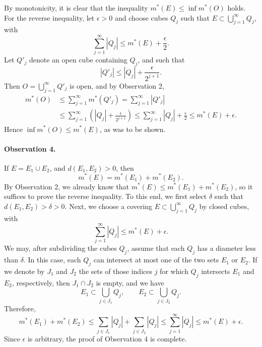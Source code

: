 \documentclass[11pt,openany]{book}
\begin{document}
By monotonicity, it is clear that the inequality $m^*(E)\le\inf m^*(O)$ holds. For the reverse inequality, let $\epsilon>0$ and choose cubes $Q_j$ such that $E\subset\bigcup_{j=1}^{\infty}Q_j$, with
\[
 \sum_{j=1}^{\infty}|Q_j|\le m^*(E)+\frac{\epsilon}{2}.
\]
Let $Q'_j$ denote an open cube containing $Q_j$, and such that
\[
 |Q'_j|\le |Q_j|+\frac{\epsilon}{2^{j+1}}.
\]
Then $O=\bigcup_{j=1}^{\infty}Q'_j$ is open, and by Observation 2,
\[
\begin{aligned}
 m^*(O)
 &\le\sum_{j=1}^{\infty}m^*(Q'_j)
 =\sum_{j=1}^{\infty}|Q'_j|\\
 &\le\sum_{j=1}^{\infty}\left(|Q_j|+\frac{\epsilon}{2^{j+1}}\right)
 \le\sum_{j=1}^{\infty}|Q_j|+\frac{\epsilon}{2}
 \le m^*(E)+\epsilon.
\end{aligned}
\]
Hence $\inf m^*(O)\le m^*(E)$, as was to be shown.

\paragraph{Observation 4.} If $E=E_1\cup E_2$, and $d(E_1,E_2)>0$, then
\[
 m^*(E)=m^*(E_1)+m^*(E_2).
\]
By Observation 2, we already know that $m^*(E)\le m^*(E_1)+m^*(E_2)$, so it suffices to prove the reverse inequality. To this end, we first select $\delta$ such that $d(E_1,E_2)>\delta>0$. Next, we choose a covering $E\subset\bigcup_{j=1}^{\infty}Q_j$ by closed cubes, with
\[
 \sum_{j=1}^{\infty}|Q_j|\le m^*(E)+\epsilon.
\]
We may, after subdividing the cubes $Q_j$, assume that each $Q_j$ has a diameter less than $\delta$. In this case, each $Q_j$ can intersect at most one of the two sets $E_1$ or $E_2$. If we denote by $J_1$ and $J_2$ the sets of those indices $j$ for which $Q_j$ intersects $E_1$ and $E_2$, respectively, then $J_1\cap J_2$ is empty, and we have
\[
 E_1\subset\bigcup_{j\in J_1}Q_j,
 \qquad
 E_2\subset\bigcup_{j\in J_2}Q_j.
\]
Therefore,
\[
 m^*(E_1)+m^*(E_2)
 \le\sum_{j\in J_1}|Q_j|+\sum_{j\in J_2}|Q_j|
 \le\sum_{j=1}^{\infty}|Q_j|
 \le m^*(E)+\epsilon.
\]
Since $\epsilon$ is arbitrary, the proof of Observation 4 is complete.
\end{document}
